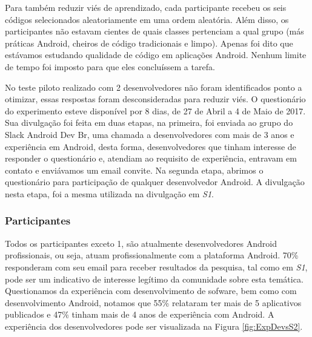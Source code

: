 Para também reduzir viés de aprendizado, cada participante recebeu os seis códigos selecionados aleatoriamente em uma ordem aleatória. Além disso, os participantes não estavam cientes de quais classes pertenciam a qual grupo (más práticas Android, cheiros de código tradicionais e limpo). Apenas foi dito que estávamos estudando qualidade de código em aplicações Android. Nenhum limite de tempo foi imposto para que eles concluíssem a tarefa.

No teste piloto realizado com 2 desenvolvedores não foram identificados ponto a otimizar, essas respostas foram desconsideradas para reduzir viés. O questionário do experimento esteve disponível por 8 dias, de 27 de Abril a 4 de Maio de 2017. Sua divulgação foi feita em duas etapas, na primeira, foi enviada ao grupo do Slack Android Dev Br, uma chamada a desenvolvedores com mais de 3 anos e experiência em Android, desta forma, desenvolvedores que tinham interesse de responder o questionário e, atendiam ao requisito de experiência, entravam em contato e enviávamos um email convite. Na segunda etapa, abrimos o questionário para participação de qualquer desenvolvedor Android. A divulgação nesta etapa, foi a mesma utilizada na divulgação em \textit{S1}. 


\subsubsection{Participantes}
\label{sub:perception-participants}
Todos os participantes exceto 1, são atualmente desenvolvedores Android profissionais, ou seja, atuam profissionalmente com a plataforma Android. 70\% responderam com seu email para receber resultados da pesquisa, tal como em \textit{S1}, pode ser um indicativo de interesse legítimo da comunidade sobre esta temática. Questionamos da experiência com desenvolvimento de sofware, bem como com desenvolvimento Android, notamos que 55\% relataram ter mais de 5 aplicativos publicados e 47\% tinham mais de 4 anos de experiência com Android. A experiência dos desenvolvedores pode ser visualizada na Figura \ref{fig:ExpDevsS2}. 

